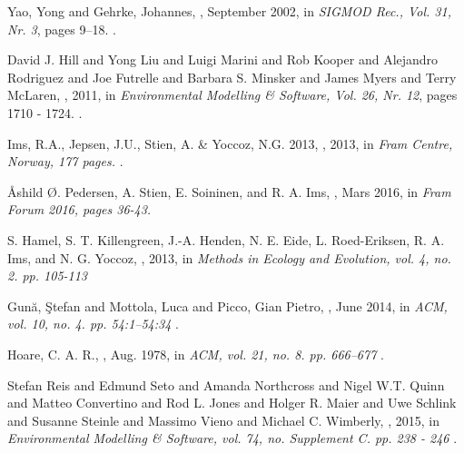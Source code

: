 \documentclass[USenglish]{uit-thesis}
\begin{document}
\begin{thebibliography}{9}
Yao, Yong and Gehrke, Johannes,
, September 2002,
\newblock in {\em  SIGMOD Rec., Vol. 31, Nr. 3}, pages 9--18.
.

David J. Hill and Yong Liu and Luigi Marini and Rob Kooper and Alejandro Rodriguez and Joe Futrelle and Barbara S. Minsker and James Myers and Terry McLaren,
, 2011,
\newblock in {\em  Environmental Modelling \& Software, Vol. 26, Nr. 12}, pages 1710 - 1724.
.

Ims, R.A., Jepsen, J.U., Stien, A. \& Yoccoz, N.G. 2013,
, 2013,
\newblock in {\em  Fram Centre, Norway, 177 pages.}
.

Åshild Ø. Pedersen, A. Stien, E. Soininen, and R. A. Ims,
, Mars 2016,
\newblock in {\em  Fram Forum 2016, pages 36-43.}

S. Hamel, S. T. Killengreen, J.-A. Henden, N. E. Eide, L. Roed-Eriksen, R. A. Ims, and N. G. Yoccoz,
, 2013,
\newblock in {\em Methods in Ecology and Evolution, vol. 4, no. 2. pp. 105-113}

Gun\u{a}, \c{S}tefan and Mottola, Luca and Picco, Gian Pietro,
, June 2014,
\newblock in {\em ACM, vol. 10, no. 4. pp. 54:1--54:34}
.

Hoare, C. A. R.,
, Aug. 1978,
\newblock in {\em ACM, vol. 21, no. 8. pp. 666--677}
.

Stefan Reis and Edmund Seto and Amanda Northcross and Nigel W.T. Quinn and Matteo Convertino and Rod L. Jones and Holger R. Maier and Uwe Schlink and Susanne Steinle and Massimo Vieno and Michael C. Wimberly,
, 2015,
\newblock in {\em Environmental Modelling \& Software, vol. 74, no. Supplement C. pp. 238 - 246}
.

\end{thebibliography}
\end{document}
